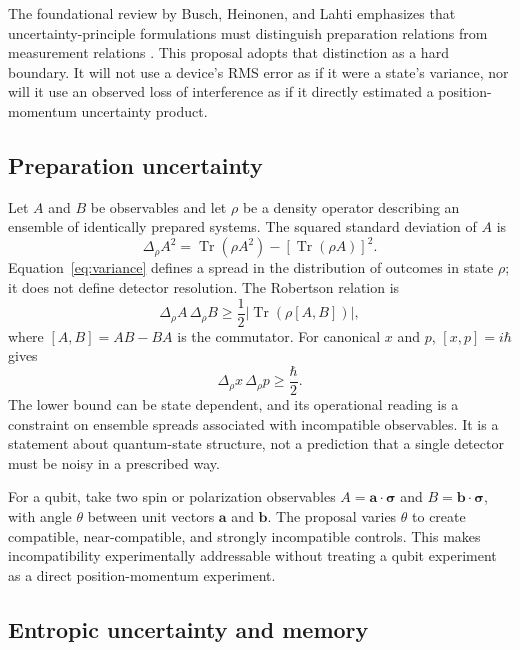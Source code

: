 \documentclass[conference]{../../../../Conference-LaTeX-template_10-17-19/IEEEtran}
\newcommand{\Tr}{\operatorname{Tr}}
\begin{document}
The foundational review by Busch, Heinonen, and Lahti emphasizes that uncertainty-principle formulations must distinguish preparation relations from measurement relations \cite{busch2007}. This proposal adopts that distinction as a hard boundary. It will not use a device's RMS error as if it were a state's variance, nor will it use an observed loss of interference as if it directly estimated a position-momentum uncertainty product.

\subsection{Preparation uncertainty}

Let $A$ and $B$ be observables and let $\rho$ be a density operator describing an ensemble of identically prepared systems. The squared standard deviation of $A$ is
\begin{equation}
\Delta_{\rho}A^2 = \Tr(\rho A^2)-\left[\Tr(\rho A)\right]^2.
\label{eq:variance}
\end{equation}
Equation~\eqref{eq:variance} defines a spread in the distribution of outcomes in state $\rho$; it does not define detector resolution. The Robertson relation is
\begin{equation}
\Delta_{\rho}A\,\Delta_{\rho}B \geq \frac{1}{2}\left|\Tr\left(\rho[A,B]\right)\right|,
\label{eq:robertson}
\end{equation}
where $[A,B]=AB-BA$ is the commutator. For canonical $x$ and $p$, $[x,p]=i\hbar$ gives
\begin{equation}
\Delta_{\rho}x\,\Delta_{\rho}p \geq \frac{\hbar}{2}.
\label{eq:xp}
\end{equation}
The lower bound can be state dependent, and its operational reading is a constraint on ensemble spreads associated with incompatible observables. It is a statement about quantum-state structure, not a prediction that a single detector must be noisy in a prescribed way.

For a qubit, take two spin or polarization observables $A=\boldsymbol{a}\cdot\boldsymbol{\sigma}$ and $B=\boldsymbol{b}\cdot\boldsymbol{\sigma}$, with angle $\theta$ between unit vectors $\boldsymbol{a}$ and $\boldsymbol{b}$. The proposal varies $\theta$ to create compatible, near-compatible, and strongly incompatible controls. This makes incompatibility experimentally addressable without treating a qubit experiment as a direct position-momentum experiment.

\subsection{Entropic uncertainty and memory}
\end{document}
